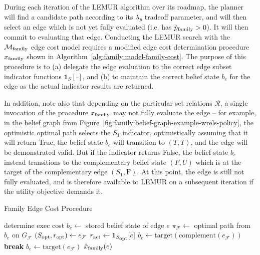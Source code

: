 During each iteration of the LEMUR algorithm over its roadmap,
the planner will find a candidate path according to its $\lambda_p$
tradeoff parameter,
and will then select an edge which is not yet fully evaluated
(i.e. has $\grave{p}_{\mbox{\scriptsize \textup{family}}} > 0$).
It will then commit to evaluating that edge.
Conducting the LEMUR search with the $\mathcal{M}_{\mbox{\scriptsize family}}$
edge cost model requires a modified edge cost determination
procedure $x_{\mbox{\scriptsize \textup{family}}}$
shown in Algorithm~\ref{alg:family:model-family-cost}.
The purpose of this procedure is to
(a) delegate the edge evaluation to the correct edge subset indicator
functions $\mathbf{1}_{S}[\cdot]$,
and (b) to maintain the correct belief state $b_e$ for the edge
as the actual indicator results are returned.

In addition,
note also that depending on the particular set relations $\mathcal{R}$,
a single invocation of the procedure $x_{\mbox{\scriptsize \textup{family}}}$
may not fully evaluate the edge --
for example, in the belief graph
from Figure~\ref{fig:family:belief-graph-example-wrels-policy},
the optimistic optimal path selects the $S_1$ indicator,
optimistically assuming that it will return True,
the belief state $b_e$ will transition to $(T,T)$,
and the edge will be demonstrated valid.
But if the indicator returns False,
the belief state $b_e$ instead transitions to the complementary
belief state $(F,U)$ which is at the target of the complementary edge
$(S_1,\mbox{F})$.
At this point,
the edge is still not fully evaluated,
and is therefore available to LEMUR on a subsequent iteration
if the utility objective demands it.

\begin{algorithm}
\caption{Family Edge Cost Procedure}
\label{alg:family:model-family-cost}
\begin{algorithmic}[1]
   \Comment determine exec cost
   \State $b_e \leftarrow$ stored belief state of edge $e$
      \State $\pi_{\mathcal{F}} \leftarrow$ optimal path from $b_e$
         on $G_{\mathcal{F}}$
         \State $(S_{\mbox{\scriptsize opt}},r_{\mbox{\scriptsize opt}}) \leftarrow e_{\mathcal{F}}$
         \State $r_{\mbox{\scriptsize act}} \leftarrow \mathbf{1}_{S_{\mbox{\scriptsize opt}}}[e]$
            \State $b_e \leftarrow \mbox{target}(\mbox{complement}(e_{\mathcal{F}}))$
            \State \textbf{break}
         \EndIf
         \State $b_e \leftarrow \mbox{target}(e_{\mathcal{F}})$
      \EndFor
   \EndIf
   \State \Return $\hat{x}_{\mbox{\scriptsize \textup{family}}}(e)$
\EndProcedure
\end{algorithmic}
\end{algorithm}

